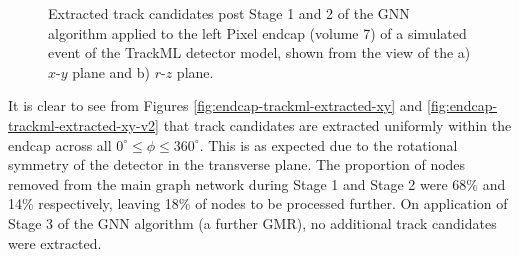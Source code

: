 \begin{figure}[htbp]%
    \centering
    \hfill
    \caption{Extracted track candidates post Stage 1 and 2 of the GNN algorithm applied to the left Pixel endcap (volume 7) of a simulated event of the TrackML detector model, shown from the view of the a) $x$-$y$ plane and b) $r$-$z$ plane.}%
    \label{fig:trackml-results-endcap-extracted-v2}%
\end{figure}

It is clear to see from Figures \ref{fig:endcap-trackml-extracted-xy} and \ref{fig:endcap-trackml-extracted-xy-v2} that track candidates are extracted uniformly within the endcap across all $ 0^{\circ} \leq \phi \leq 360^{\circ}$. This is as expected due to the rotational symmetry of the detector in the transverse plane. The proportion of nodes removed from the main graph network during Stage 1 and Stage 2 were 68\% and 14\% respectively, leaving 18\% of nodes to be processed further. On application of Stage 3 of the GNN algorithm (a further GMR), no additional track candidates were extracted.

